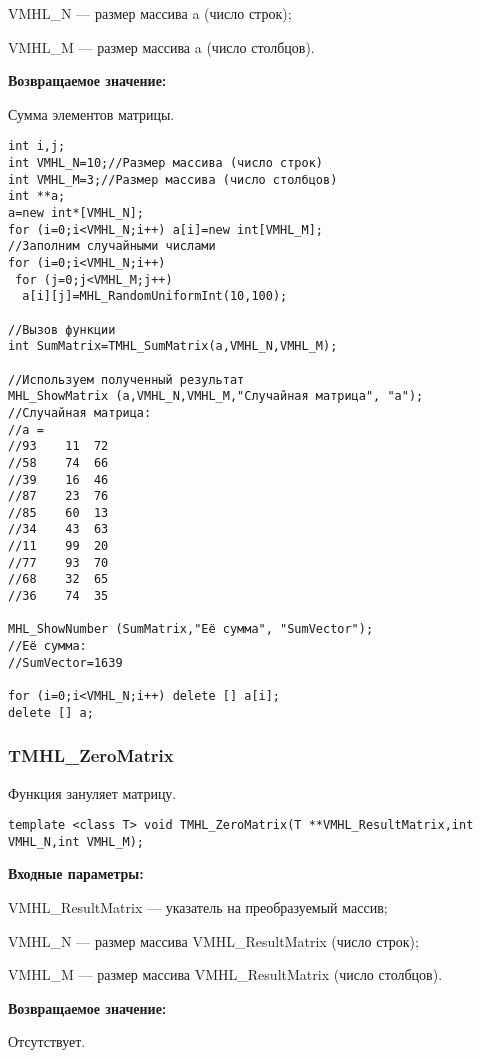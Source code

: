 \documentclass[a4paper,12pt]{article}
\begin{document}
 VMHL\_N --- размер массива a (число строк);
 
 VMHL\_M --- размер массива a (число столбцов).

\textbf{Возвращаемое значение:}

 Сумма элементов матрицы.


\begin{lstlisting}[label=code_use_TMHL_SumMatrix,caption=Пример использования]
int i,j;
int VMHL_N=10;//Размер массива (число строк)
int VMHL_M=3;//Размер массива (число столбцов)
int **a;
a=new int*[VMHL_N];
for (i=0;i<VMHL_N;i++) a[i]=new int[VMHL_M];
//Заполним случайными числами
for (i=0;i<VMHL_N;i++)
 for (j=0;j<VMHL_M;j++)
  a[i][j]=MHL_RandomUniformInt(10,100);

//Вызов функции
int SumMatrix=TMHL_SumMatrix(a,VMHL_N,VMHL_M);

//Используем полученный результат
MHL_ShowMatrix (a,VMHL_N,VMHL_M,"Случайная матрица", "a");
//Случайная матрица:
//a =
//93	11	72
//58	74	66
//39	16	46
//87	23	76
//85	60	13
//34	43	63
//11	99	20
//77	93	70
//68	32	65
//36	74	35

MHL_ShowNumber (SumMatrix,"Её сумма", "SumVector");
//Её сумма:
//SumVector=1639

for (i=0;i<VMHL_N;i++) delete [] a[i];
delete [] a;
\end{lstlisting}

\subsubsection{TMHL\_ZeroMatrix}\label{TMHL_ZeroMatrix}

Функция зануляет матрицу.


\begin{lstlisting}[label=code_syntax_TMHL_ZeroMatrix,caption=Синтаксис]
template <class T> void TMHL_ZeroMatrix(T **VMHL_ResultMatrix,int VMHL_N,int VMHL_M);
\end{lstlisting}

\textbf{Входные параметры:}

 VMHL\_ResultMatrix --- указатель на преобразуемый массив;
 
 VMHL\_N --- размер массива VMHL\_ResultMatrix (число строк);
 
 VMHL\_M --- размер массива VMHL\_ResultMatrix (число столбцов).

\textbf{Возвращаемое значение:}

 Отсутствует.
\end{document}
